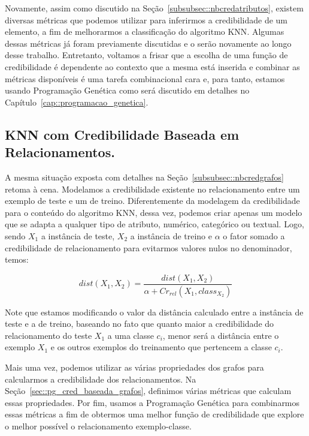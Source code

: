 Novamente, assim como discutido na Seção~\ref{subsubsec::nbcredatributos}, existem diversas métricas que podemos utilizar para inferirmos a credibilidade de um elemento, a fim de melhorarmos a classificação do algoritmo \textsc{KNN}. Algumas dessas métricas já foram previamente discutidas e o serão novamente ao longo desse trabalho. Entretanto, voltamos a frisar que a escolha de uma função de credibilidade é dependente ao contexto que a mesma está inserida e combinar as métricas disponíveis é uma tarefa combinacional cara e, para tanto, estamos usando Programação Genética como será discutido em detalhes no Capítulo~\ref{cap::programacao_genetica}.

\subsection{\textsc{KNN} com Credibilidade Baseada em Relacionamentos.}
\label{subsubsec::knncredgrafos}

A mesma situação exposta com detalhes na Seção~\ref{subsubsec::nbcredgrafos} retoma à cena. Modelamos a credibilidade existente no relacionamento entre um exemplo de teste e um de treino. 
Diferentemente da modelagem da credibilidade para o conteúdo do algoritmo \textsc{KNN}, dessa vez, podemos criar apenas um modelo que se adapta a qualquer tipo de atributo, numérico, categórico ou textual. Logo, sendo $X_1$ a instância de teste, $X_2$ a instância de treino e $\alpha$ o fator somado a credibilidade de relacionamento para evitarmos valores nulos no denominador, temos:

\begin{equation}\label{eqn::distancia_grafos}
    dist(X_1, X_2) = \frac{ dist(X_1, X_2) } { \alpha + Cr_{rel}(X_1, class_{X_2}) }
\end{equation}

Note que estamos modificando o valor da distância calculado entre a instância de teste e a de treino, baseando no fato que quanto maior a credibilidade do relacionamento do teste $X_1$ a uma classe $c_i$, menor será a distância entre o exemplo $X_1$ e os outros exemplos do treinamento que pertencem a classe $c_i$.

Mais uma vez, podemos utilizar as várias propriedades dos grafos para calcularmos a credibilidade dos relacionamentos. Na Seção~\ref{sec::pg_cred_baseada_grafos}, definimos várias métricas que calculam essas propriedades. Por fim, usamos a Programação Genética para combinarmos essas métricas a fim de obtermos uma melhor função de credibilidade que explore o melhor possível o relacionamento exemplo-classe.

